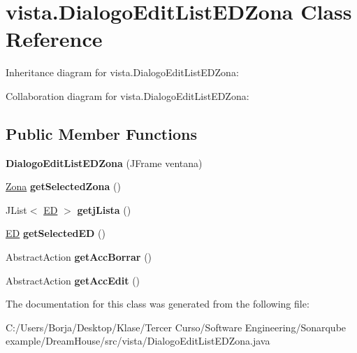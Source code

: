 \hypertarget{classvista_1_1_dialogo_edit_list_e_d_zona}{}\section{vista.\+Dialogo\+Edit\+List\+E\+D\+Zona Class Reference}
\label{classvista_1_1_dialogo_edit_list_e_d_zona}


Inheritance diagram for vista.\+Dialogo\+Edit\+List\+E\+D\+Zona\+:


Collaboration diagram for vista.\+Dialogo\+Edit\+List\+E\+D\+Zona\+:
\subsection*{Public Member Functions}
\begin{DoxyCompactItemize}
\item 
\mbox{\label{classvista_1_1_dialogo_edit_list_e_d_zona_a273305aa9830fb4708b0e5e61ce23d7b}} 
{\bfseries Dialogo\+Edit\+List\+E\+D\+Zona} (J\+Frame ventana)
\item 
\mbox{\label{classvista_1_1_dialogo_edit_list_e_d_zona_a46296f052e9839a3a8c3a8afa7e35fb1}} 
\mbox{\hyperlink{classmodelo_1_1_zona}{Zona}} {\bfseries get\+Selected\+Zona} ()
\item 
\mbox{\label{classvista_1_1_dialogo_edit_list_e_d_zona_a04493b294406aacc92c5ee9e8fee9351}} 
J\+List$<$ \mbox{\hyperlink{classmodelo_1_1_e_d}{ED}} $>$ {\bfseries getj\+Lista} ()
\item 
\mbox{\label{classvista_1_1_dialogo_edit_list_e_d_zona_a9ce7cbbde3889d56943a129bec80b538}} 
\mbox{\hyperlink{classmodelo_1_1_e_d}{ED}} {\bfseries get\+Selected\+ED} ()
\item 
\mbox{\label{classvista_1_1_dialogo_edit_list_e_d_zona_abd21175b4de94d23382219f555e5f6a4}} 
Abstract\+Action {\bfseries get\+Acc\+Borrar} ()
\item 
\mbox{\label{classvista_1_1_dialogo_edit_list_e_d_zona_a50a415351186eb3e9ad68a981f53bd61}} 
Abstract\+Action {\bfseries get\+Acc\+Edit} ()
\end{DoxyCompactItemize}


The documentation for this class was generated from the following file\+:\begin{DoxyCompactItemize}
\item 
C\+:/\+Users/\+Borja/\+Desktop/\+Klase/\+Tercer Curso/\+Software Engineering/\+Sonarqube example/\+Dream\+House/src/vista/Dialogo\+Edit\+List\+E\+D\+Zona.\+java\end{DoxyCompactItemize}
